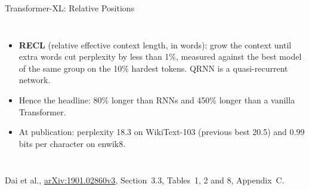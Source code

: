 \begin{frame}{Transformer-XL: Relative Positions}
\begin{columns}[T,onlytextwidth]
\begin{itemize}
        \item[\textcolor{red}{$\blacktriangleright$}] \textbf{RECL} (relative effective context length, in words): grow the context until extra words cut perplexity by less than 1\%, measured against the best model of the same group on the 10\% hardest tokens. QRNN is a quasi-recurrent network.
        \item[\textcolor{red}{$\blacktriangleright$}] Hence the headline: 80\% longer than RNNs and 450\% longer than a vanilla Transformer.
        \item[\textcolor{red}{$\blacktriangleright$}] At publication: perplexity 18.3 on WikiText-103 (previous best 20.5) and 0.99 bits per character on enwik8.
      \end{itemize}
  \end{columns}
  \vspace{0.1em}
  {\scriptsize Dai et al., \href{https://arxiv.org/abs/1901.02860v3}{arXiv:1901.02860v3}, Section~3.3, Tables~1, 2 and 8, Appendix~C.}
\end{frame}

